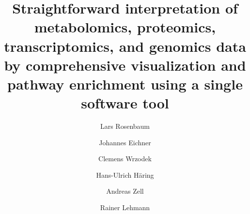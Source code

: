 \documentclass[final,5p,times,twocolumn]{elsarticle}
\begin{document}
\begin{frontmatter}



\title{Straightforward interpretation of metabolomics, proteomics, transcriptomics, and genomics data by comprehensive visualization and pathway enrichment using a single software tool}


\author[uni]{Lars Rosenbaum}
\author[uni]{Johannes Eichner}
\author[uni]{Clemens Wrzodek}
\author[endo,dzd]{Hans-Ulrich H\"aring}
\author[uni]{Andreas Zell}
\author[zentrallabor,dzd]{Rainer Lehmann}
\address[uni]{Center for Bioinformatics, University of T\"ubingen, T\"ubingen, Germany}
\address[dzd]{Institute of Diabetes Research and Metabolic Diseases, Member of the German Center for Diabetes Research, University of T\"ubingen, T\"ubingen, Germany}
\address[endo]{Department of Internal Medicine, Division of Endocrinology, Diabetology, Vascular Medicine, Nephrology and Clinical Chemistry, University Hospital T\"ubingen, T\"ubingen, Germany}
\address[zentrallabor]{Division of Clinical Chemistry and Pathobiochemistry (Central Laboratory), University Hospital T\"ubingen, T\"ubingen, Germany}




\end{frontmatter}
\end{document}
